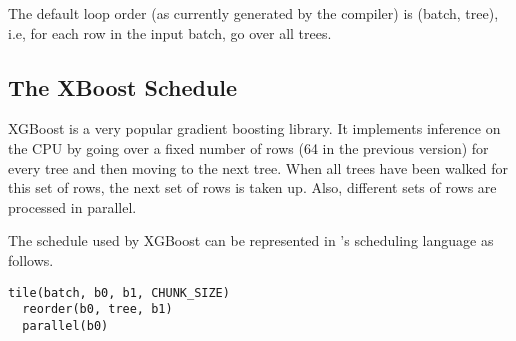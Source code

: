 
The default loop order (as currently generated by the compiler) is (batch, tree), i.e, for each row in the input batch, go over all trees.

\subsection{The XBoost Schedule}
XGBoost\cite{XGBoost} is a very popular gradient boosting library. 
It implements inference on the CPU by going over a fixed number of rows (64 in the previous version)
for every tree and then moving to the next tree. When all trees have been walked for this 
set of rows, the next set of rows is taken up. Also, different sets of rows are 
processed in parallel.

The schedule used by XGBoost can be represented in \Treebeard{}'s scheduling 
language as follows.
\begin{lstlisting}[style=c++]
  tile(batch, b0, b1, CHUNK_SIZE)
  reorder(b0, tree, b1)
  parallel(b0)
\end{lstlisting}

